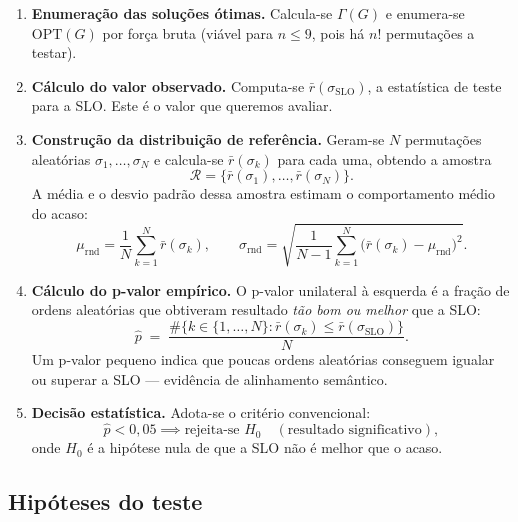 \documentclass[a4paper,11pt]{article}
\begin{document}
\begin{enumerate}[label=\textbf{Passo \arabic*.}, leftmargin=*, itemsep=6pt]

  \item \textbf{Enumeração das soluções ótimas.}
    Calcula-se $\Gamma(G)$ e enumera-se $\text{OPT}(G)$ por força bruta
    (viável para $n \leq 9$, pois há $n!$ permutações a testar).

  \item \textbf{Cálculo do valor observado.}
    Computa-se $\bar{r}(\sigma_{\text{SLO}})$, a estatística de teste
    para a SLO. Este é o valor que queremos avaliar.

  \item \textbf{Construção da distribuição de referência.}
    Geram-se $N$ permutações aleatórias $\sigma_1, \ldots, \sigma_N$
    e calcula-se $\bar{r}(\sigma_k)$ para cada uma, obtendo a amostra
    \[
      \mathcal{R} = \{\bar{r}(\sigma_1), \ldots, \bar{r}(\sigma_N)\}.
    \]
    A média e o desvio padrão dessa amostra estimam o comportamento
    médio do acaso:
    \[
      \mu_{\text{rnd}} = \frac{1}{N}\sum_{k=1}^N \bar{r}(\sigma_k),
      \qquad
      \sigma_{\text{rnd}} = \sqrt{\frac{1}{N-1}\sum_{k=1}^N
      \bigl(\bar{r}(\sigma_k) - \mu_{\text{rnd}}\bigr)^2}.
    \]

  \item \textbf{Cálculo do p-valor empírico.}
    O p-valor unilateral à esquerda é a fração de ordens aleatórias
    que obtiveram resultado \emph{tão bom ou melhor} que a SLO:
    \begin{equation}
      \hat{p} \;=\;
      \frac{\#\{k \in \{1,\ldots,N\} : \bar{r}(\sigma_k)
      \leq \bar{r}(\sigma_{\text{SLO}})\}}{N}.
      \label{eq:pval}
    \end{equation}
    Um p-valor pequeno indica que poucas ordens aleatórias conseguem
    igualar ou superar a SLO — evidência de alinhamento semântico.

  \item \textbf{Decisão estatística.}
    Adota-se o critério convencional:
    \[
      \hat{p} < 0{,}05 \implies \text{rejeita-se } H_0
      \quad (\text{resultado significativo}),
    \]
    onde $H_0$ é a hipótese nula de que a SLO não é melhor que o acaso.

\end{enumerate}

\subsection{Hipóteses do teste}
\end{document}
